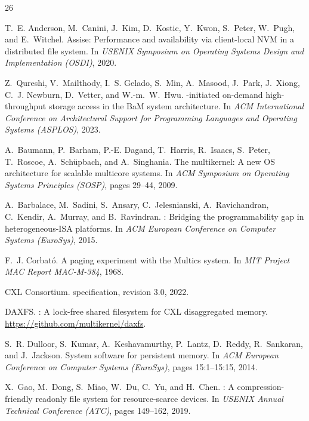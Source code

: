 \documentclass[letterpaper,twocolumn,10pt]{article}
\begin{document}
\begin{thebibliography}{26}

T.~E. Anderson, M.~Canini, J.~Kim, D.~Kostic, Y.~Kwon, S.~Peter,
  W.~Pugh, and E.~Witchel.
\newblock Assise: Performance and availability via client-local {NVM} in a
  distributed file system.
\newblock In {\em USENIX Symposium on Operating Systems Design and
  Implementation (OSDI)}, 2020.

Z.~Qureshi, V.~Mailthody, I.~S. Gelado, S.~Min, A.~Masood, J.~Park,
  J.~Xiong, C.~J. Newburn, D.~Vetter, and W.-m.~W.~Hwu.
-initiated on-demand high-throughput storage access in the
  {BaM} system architecture.
\newblock In {\em ACM International Conference on Architectural Support for
  Programming Languages and Operating Systems (ASPLOS)}, 2023.

A.~Baumann, P.~Barham, P.-E. Dagand, T.~Harris, R.~Isaacs, S.~Peter,
  T.~Roscoe, A.~Sch\"upbach, and A.~Singhania.
\newblock The multikernel: A new {OS} architecture for scalable multicore
  systems.
\newblock In {\em ACM Symposium on Operating Systems Principles (SOSP)}, pages
  29--44, 2009.

A.~Barbalace, M.~Sadini, S.~Ansary, C.~Jelesnianski, A.~Ravichandran,
  C.~Kendir, A.~Murray, and B.~Ravindran.
: Bridging the programmability gap in heterogeneous-{ISA}
  platforms.
\newblock In {\em ACM European Conference on Computer Systems (EuroSys)}, 2015.

F.~J. Corbat\'{o}.
\newblock A paging experiment with the {Multics} system.
\newblock In {\em MIT Project MAC Report MAC-M-384}, 1968.

{CXL Consortium}.
 specification, revision 3.0, 2022.

{DAXFS}.
: A lock-free shared filesystem for {CXL} disaggregated
  memory.
\newblock \url{https://github.com/multikernel/daxfs}.

S.~R. Dulloor, S.~Kumar, A.~Keshavamurthy, P.~Lantz, D.~Reddy, R.~Sankaran,
  and J.~Jackson.
\newblock System software for persistent memory.
\newblock In {\em ACM European Conference on Computer Systems (EuroSys)}, pages
  15:1--15:15, 2014.

X.~Gao, M.~Dong, S.~Miao, W.~Du, C.~Yu, and H.~Chen.
: A compression-friendly readonly file system for
  resource-scarce devices.
\newblock In {\em USENIX Annual Technical Conference (ATC)}, pages 149--162,
  2019.


\end{thebibliography}
\end{document}
